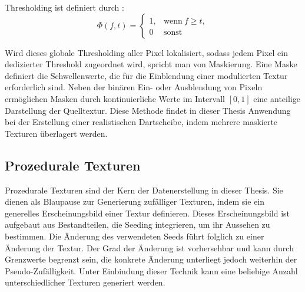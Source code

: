 Thresholding ist definiert durch \cite{cv_general}:
\[\Phi(f, t) = \begin{cases}
    1, &\text{wenn}~f \geq t,\\
    0 &\text{sonst}
\end{cases}\]

Wird dieses globale Thresholding aller Pixel lokalisiert, sodass jedem Pixel ein dedizierter Threshold zugeordnet wird, spricht man von Maskierung. Eine Maske definiert die Schwellenwerte, die für die Einblendung einer modulierten Textur erforderlich sind. Neben der binären Ein- oder Ausblendung von Pixeln ermöglichen Masken durch kontinuierliche Werte im Intervall $[0, 1]$ eine anteilige Darstellung der Quelltextur. Diese Methode findet in dieser Thesis Anwendung bei der Erstellung einer realistischen Dartscheibe, indem mehrere maskierte Texturen überlagert werden.


\subsection{Prozedurale Texturen}
\label{sec:was_prozedurale_texturen}

Prozedurale Texturen sind der Kern der Datenerstellung in dieser Thesis. Sie dienen als Blaupause zur Generierung zufälliger Texturen, indem sie ein generelles Erscheinungsbild einer Textur definieren. Dieses Erscheinungsbild ist aufgebaut aus Bestandteilen, die Seeding integrieren, um ihr Aussehen zu bestimmen. Die Änderung des verwendeten Seeds führt folglich zu einer Änderung der Textur. Der Grad der Änderung ist vorhersehbar und kann durch Grenzwerte begrenzt sein, die konkrete Änderung unterliegt jedoch weiterhin der Pseudo-Zufälligkeit. Unter Einbindung dieser Technik kann eine beliebige Anzahl unterschiedlicher Texturen generiert werden.
